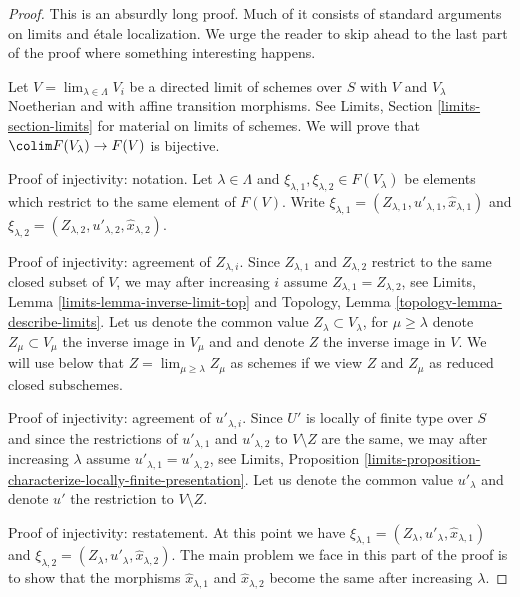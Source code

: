 \begin{proof}

This is an absurdly long proof. Much of it consists of standard
arguments on limits and \'etale localization. We urge the reader to skip ahead
to the last part of the proof where something interesting happens.

\medskip\noindent
Let $V = \lim_{\lambda \in \Lambda} V_i$ be a directed limit of schemes
over $S$ with $V$ and $V_\lambda$ Noetherian and with affine transition
morphisms. See Limits, Section \ref{limits-section-limits} for material on
limits of schemes. We will prove that $\colim F(V_\lambda) \to F(V)$
is bijective.

\medskip\noindent
Proof of injectivity: notation.
Let $\lambda \in \Lambda$ and
$\xi_{\lambda, 1}, \xi_{\lambda, 2} \in F(V_\lambda)$
be elements which restrict to the same element of $F(V)$.
Write $\xi_{\lambda, 1} = (Z_{\lambda, 1}, u'_{\lambda, 1},
\hat x_{\lambda, 1})$ and
$\xi_{\lambda, 2} = (Z_{\lambda, 2}, u'_{\lambda, 2}, \hat x_{\lambda, 2})$.

\medskip\noindent
Proof of injectivity: agreement of $Z_{\lambda, i}$.
Since $Z_{\lambda, 1}$ and $Z_{\lambda, 2}$ restrict to the same closed
subset of $V$, we may after increasing $i$ assume
$Z_{\lambda, 1} = Z_{\lambda, 2}$, see
Limits, Lemma \ref{limits-lemma-inverse-limit-top} and
Topology, Lemma \ref{topology-lemma-describe-limits}.
Let us denote the common value $Z_\lambda \subset V_\lambda$, for
$\mu \geq \lambda$
denote $Z_\mu \subset V_\mu$ the inverse image in $V_\mu$ and
and denote $Z$ the inverse image in $V$. We will use below that
$Z = \lim_{\mu \geq \lambda} Z_\mu$ as schemes if we view $Z$
and $Z_\mu$ as reduced closed subschemes.

\medskip\noindent
Proof of injectivity: agreement of $u'_{\lambda, i}$.
Since $U'$ is locally of finite type over $S$ and since
the restrictions of $u'_{\lambda, 1}$ and $u'_{\lambda, 2}$
to $V \setminus Z$ are the same, we may after increasing $\lambda$ assume
$u'_{\lambda, 1} = u'_{\lambda, 2}$, see Limits, Proposition
\ref{limits-proposition-characterize-locally-finite-presentation}.
Let us denote the common value $u'_\lambda$ and denote
$u'$ the restriction to $V \setminus Z$.

\medskip\noindent
Proof of injectivity: restatement.
At this point we have
$\xi_{\lambda, 1} = (Z_\lambda, u'_\lambda, \hat x_{\lambda, 1})$ and
$\xi_{\lambda, 2} = (Z_\lambda, u'_\lambda, \hat x_{\lambda, 2})$.
The main problem we face in this part of the proof
is to show that the morphisms
$\hat x_{\lambda, 1}$ and $\hat x_{\lambda, 2}$ become the same after
increasing $\lambda$.


\end{proof}
